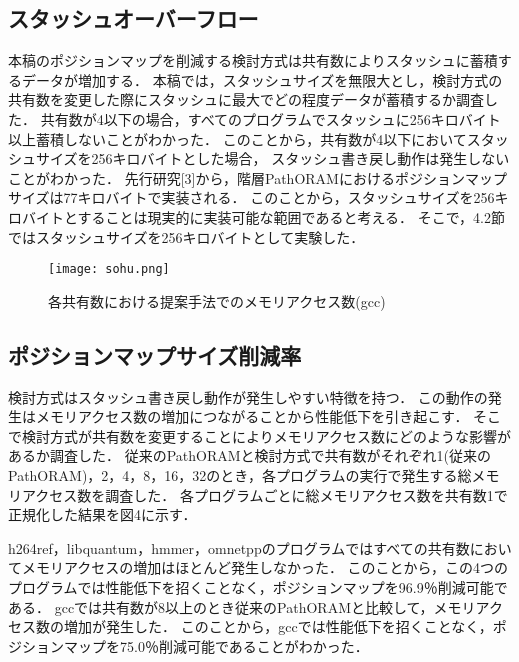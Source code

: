 \documentclass{jarticle}
\begin{document}
\subsection{スタッシュオーバーフロー}
 本稿のポジションマップを削減する検討方式は共有数によりスタッシュに蓄積するデータが増加する．
 本稿では，スタッシュサイズを無限大とし，検討方式の共有数を変更した際にスタッシュに最大でどの程度データが蓄積するか調査した．
共有数が4以下の場合，すべてのプログラムでスタッシュに256キロバイト以上蓄積しないことがわかった．
このことから，共有数が4以下においてスタッシュサイズを256キロバイトとした場合，
スタッシュ書き戻し動作は発生しないことがわかった．
先行研究[3]から，階層PathORAMにおけるポジションマップサイズは77キロバイトで実装される．
このことから，スタッシュサイズを256キロバイトとすることは現実的に実装可能な範囲であると考える．
そこで，4.2節ではスタッシュサイズを256キロバイトとして実験した．

\begin{figure}[t]
  \texttt{[image: sohu.png]}
  \caption{各共有数における提案手法でのメモリアクセス数(gcc)}
  \label{gccres}
\end{figure}


\subsection{ポジションマップサイズ削減率}

検討方式はスタッシュ書き戻し動作が発生しやすい特徴を持つ．
この動作の発生はメモリアクセス数の増加につながることから性能低下を引き起こす．
そこで検討方式が共有数を変更することによりメモリアクセス数にどのような影響があるか調査した．
従来のPathORAMと検討方式で共有数がそれぞれ1(従来のPathORAM)，2，4，8，16，32のとき，各プログラムの実行で発生する総メモリアクセス数を調査した．
各プログラムごとに総メモリアクセス数を共有数1で正規化した結果を図4に示す．

%
h264ref，libquantum，hmmer，omnetppのプログラムではすべての共有数においてメモリアクセスの増加はほとんど発生しなかった．
このことから，この4つのプログラムでは性能低下を招くことなく，ポジションマップを96.9％削減可能である．
gccでは共有数が8以上のとき従来のPathORAMと比較して，メモリアクセス数の増加が発生した．
このことから，gccでは性能低下を招くことなく，ポジションマップを75.0％削減可能であることがわかった．
\end{document}

